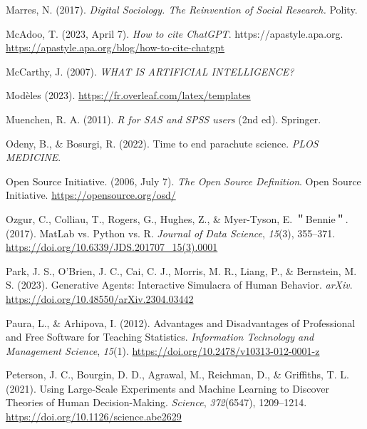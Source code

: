 \documentclass[
  letterpaper,
  DIV=11,
  numbers=noendperiod]{scrreprt}
\newlength{\cslhangindent}
\newlength{\cslentryspacingunit} %
\newenvironment{CSLReferences}[2] %
 {%
  \setlength{\parindent}{0pt}
  \ifodd #1
  \let\oldpar\par
  \def\par{\hangindent=\cslhangindent\oldpar}
  \fi
  \setlength{\parskip}{#2\cslentryspacingunit}
 }%
 {}
\begin{document}
\begin{CSLReferences}{1}{0}
\leavevmode{}%
Marres, N. (2017). \emph{Digital {Sociology}. {The Reinvention} of
{Social Research}.} Polity.

\leavevmode{}%
McAdoo, T. (2023, April 7). \emph{How to cite {ChatGPT}}.
https://apastyle.apa.org.
\url{https://apastyle.apa.org/blog/how-to-cite-chatgpt}

\leavevmode{}%
McCarthy, J. (2007). \emph{{WHAT IS ARTIFICIAL INTELLIGENCE}?}

\leavevmode{}%
Modèles (2023). \url{https://fr.overleaf.com/latex/templates}

\leavevmode{}%
Muenchen, R. A. (2011). \emph{R for {SAS} and {SPSS} users} (2nd ed).
Springer.

\leavevmode{}%
Odeny, B., \& Bosurgi, R. (2022). Time to end parachute science.
\emph{PLOS MEDICINE}.

\leavevmode{}%
Open Source Initiative. (2006, July 7). \emph{The {Open Source
Definition}}. Open Source Initiative. \url{https://opensource.org/osd/}

\leavevmode{}%
Ozgur, C., Colliau, T., Rogers, G., Hughes, Z., \& Myer-Tyson, E.
＂Bennie＂. (2017). {MatLab} vs. {Python} vs. {R}. \emph{Journal of Data
Science}, \emph{15}(3), 355--371.
\url{https://doi.org/10.6339/JDS.201707_15(3).0001}

\leavevmode{}%
Park, J. S., O'Brien, J. C., Cai, C. J., Morris, M. R., Liang, P., \&
Bernstein, M. S. (2023). Generative {Agents}: {Interactive Simulacra} of
{Human Behavior}. \emph{arXiv}.
\url{https://doi.org/10.48550/arXiv.2304.03442}

\leavevmode{}%
Paura, L., \& Arhipova, I. (2012). Advantages and {Disadvantages} of
{Professional} and {Free Software} for {Teaching Statistics}.
\emph{Information Technology and Management Science}, \emph{15}(1).
\url{https://doi.org/10.2478/v10313-012-0001-z}

\leavevmode{}%
Peterson, J. C., Bourgin, D. D., Agrawal, M., Reichman, D., \&
Griffiths, T. L. (2021). Using {Large-Scale Experiments} and {Machine
Learning} to {Discover Theories} of {Human Decision-Making}.
\emph{Science}, \emph{372}(6547), 1209--1214.
\url{https://doi.org/10.1126/science.abe2629}


\end{CSLReferences}
\end{document}
